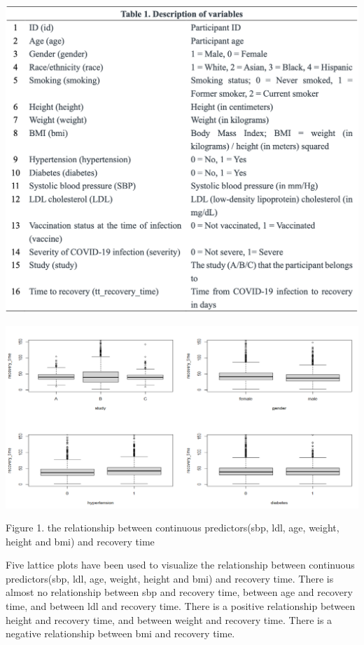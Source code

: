 \documentclass[
]{article}
\begin{document}
\begin{center}\includegraphics[width=0.9\linewidth,height=0.7\textheight]{./first} \end{center}

\begin{center}\includegraphics[width=0.9\linewidth,height=0.7\textheight]{primary_analysis_plot/Explanatory analysis and visualization_boxplot_1} \end{center}
\begin{center}
Figure 1. the relationship between continuous predictors(sbp, ldl, age, weight, height and bmi) and recovery time
\end{center}

Five lattice plots have been used to visualize the relationship between
continuous predictors(sbp, ldl, age, weight, height and bmi) and
recovery time. There is almost no relationship between sbp and recovery
time, between age and recovery time, and between ldl and recovery time.
There is a positive relationship between height and recovery time, and
between weight and recovery time. There is a negative relationship
between bmi and recovery time.
\end{document}
